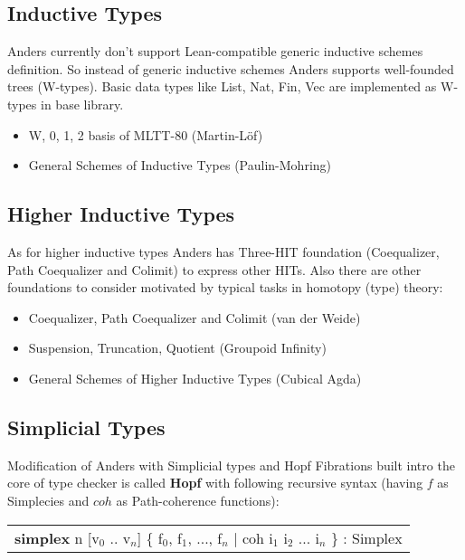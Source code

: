 \documentclass[a4paper,UKenglish,cleveref, autoref, thm-restate]{lipics-v2021}
\newcommand{\tabstyle}[0]{\scriptsize\ttfamily\fontseries{l}\selectfont}
\begin{document}
\newpage
\subsection{Inductive Types}

Anders currently don’t support Lean-compatible generic inductive schemes
definition. So instead of generic inductive schemes Anders supports well-founded trees (W-types).
Basic data types like List, Nat, Fin, Vec are implemented as W-types in base library.

\begin{itemize}
\item W, 0, 1, 2 basis of MLTT-80 (Martin-L\"{o}f)
\item General Schemes of Inductive Types (Paulin-Mohring)
\end{itemize}

\subsection{Higher Inductive Types}

As for higher inductive types Anders has Three-HIT foundation (Coequalizer, Path Coequalizer and Colimit)
to express other HITs. Also there are other foundations to consider motivated by typical tasks in homotopy (type) theory:

\begin{itemize}
\item Coequalizer, Path Coequalizer and Colimit (van der Weide)
\item Suspension, Truncation, Quotient (Groupoid Infinity)
\item General Schemes of Higher Inductive Types (Cubical Agda)
\end{itemize}

\subsection{Simplicial Types}

Modification of Anders with Simplicial types and Hopf Fibrations built intro the core of type checker
is called \textbf{Hopf} with following recursive syntax (having $f$ as Simplecies and $coh$ as Path-coherence functions):

\begin{table}[ht]
\tabstyle
\begin{tabular}{l}
   \textbf{simplex} n [v$_0$ .. v$_n$] \{ f$_0$, f$_1$, ..., f$_n$ | coh i$_1$ i$_2$ ... i$_n$ \} : Simplex
\end{tabular}
\end{table}
\end{document}
